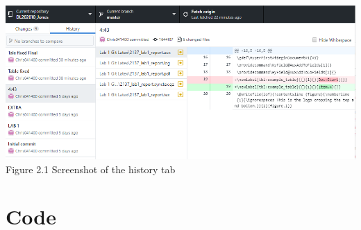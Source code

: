 \documentclass[11pt]{article}
\newcommand{\Verilog}[2][]{%
	
}
\begin{document}
\begin{center}    
    \includegraphics[width=1.0\textwidth, trim = .1cm .1cm .5cm .1cm,clip]{capture2.PNG}
	\center Figure 2.1 Screenshot of the history tab
\end{center}
	
\section*{Code}

\Verilog[caption=File-included Verilog code example,label=code:file_ex]{lab1_example_code.sv}
\end{document}
